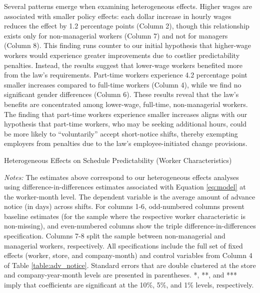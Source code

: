 \documentclass[letterpaper,11pt,leqno]{article}
\theoremstyle{paper}
\newcommand{\note}[2][]{\parbox{\textwidth}{\footnotesize\vspace*{10pt}\textit{#1}#2}}
\begin{document}
Several patterns emerge when examining heterogeneous effects. Higher wages are associated with smaller policy effects: each dollar increase in hourly wages reduces the effect by 1.2 percentage points (Column 2), though this relationship exists only for non-managerial workers (Column 7) and not for managers (Column 8). This finding runs counter to our initial hypothesis that higher-wage workers would experience greater improvements due to costlier predictability penalties. Instead, the results suggest that lower-wage workers benefited more from the law's requirements. Part-time workers experience 4.2 percentage point smaller increases compared to full-time workers (Column 4), while we find no significant gender differences (Column 6). These results reveal that the law's benefits are concentrated among lower-wage, full-time, non-managerial workers. The finding that part-time workers experience smaller increases aligns with our hypothesis that part-time workers, who may be seeking additional hours, could be more likely to “voluntarily” accept short-notice shifts, thereby exempting employers from penalties due to the law's employee-initiated change provisions.


\begin{singlespace}
\begin{table}[h]
\caption{Heterogeneous Effects on Schedule Predictability (Worker Characteristics)}

\note{\scriptsize \textit{Notes: } The estimates above correspond to our heterogeneous effects analyses using difference-in-differences estimates associated with Equation \ref{eq:model} at the worker-month level. The dependent variable is the average amount of advance notice (in days) across shifts. For columns 1-6, odd-numbered columns present baseline estimates (for the sample where the respective worker characteristic is non-missing), and even-numbered columns show the triple difference-in-differences specification. Columns 7-8 split the sample between non-managerial and managerial workers, respectively. All specifications include the full set of fixed effects (worker, store, and company-month) and control variables from Column 4 of Table \ref{table:adv_notice}. Standard errors that are double clustered at the store and company-year-month levels are presented in parentheses. *, **, and *** imply that coefficients are significant at the 10\%, 5\%, and 1\% levels, respectively.}
\label{table:adv_notice_het_effects}
\end{table}
\end{singlespace}
\end{document}
